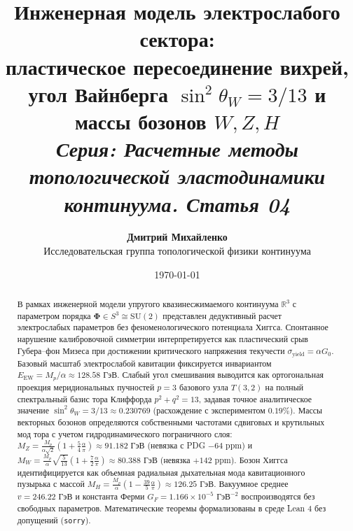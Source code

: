 \documentclass[11pt,a4paper]{article}
\theoremstyle{definition}
\theoremstyle{remark}
\begin{document}
\title{\textbf{\Large Инженерная модель электрослабого сектора:}\\
\large пластическое пересоединение вихрей, угол Вайнберга $\sin^2\theta_W = 3/13$ и массы бозонов $W, Z, H$\\[2mm]
\normalsize \textit{Серия: Расчетные методы топологической эластодинамики континуума. Статья 04}}

\author{\textbf{Дмитрий Михайленко}\\[1mm]
\small Исследовательская группа топологической физики континуума}

\date{\today}

\maketitle

\begin{abstract}
\noindent В рамках инженерной модели упругого квазинесжимаемого континуума $\mathbb{R}^3$ с параметром порядка $\boldsymbol{\Phi} \in S^3 \cong \mathrm{SU}(2)$ представлен дедуктивный расчет электрослабых параметров без феноменологического потенциала Хиггса. Спонтанное нарушение калибровочной симметрии интерпретируется как пластический срыв Губера--фон Мизеса при достижении критического напряжения текучести $\sigma_{\mathrm{yield}} = \alpha G_0$. Базовый масштаб электрослабой кавитации фиксируется инвариантом $E_{\mathrm{EW}} = M_p / \alpha \approx 128.58\text{ ГэВ}$. Слабый угол смешивания выводится как ортогональная проекция меридиональных пучностей $p=3$ базового узла $T(3,2)$ на полный спектральный базис тора Клиффорда $p^2 + q^2 = 13$, задавая точное аналитическое значение $\sin^2\theta_W = 3/13 \approx 0.230769$ (расхождение с экспериментом $0.19\%$). Массы векторных бозонов определяются собственными частотами сдвиговых и крутильных мод тора с учетом гидродинамического пограничного слоя: $M_Z = \frac{M_p}{\alpha\sqrt{2}}(1 + \frac{5}{4}\frac{\alpha}{\pi}) \approx 91.182\text{ ГэВ}$ (невязка с PDG $-64\text{ ppm}$) и $M_W = \frac{M_p}{\alpha}\sqrt{\frac{5}{13}}(1 + \frac{7}{2}\frac{\alpha}{\pi}) \approx 80.388\text{ ГэВ}$ (невязка $+142\text{ ppm}$). Бозон Хиггса идентифицируется как объемная радиальная дыхательная мода кавитационного пузырька с массой $M_H = \frac{M_p}{\alpha}(1 - \frac{39}{5}\frac{\alpha}{\pi}) \approx 126.25\text{ ГэВ}$. Вакуумное среднее $v = 246.22\text{ ГэВ}$ и константа Ферми $G_F = 1.166 \times 10^{-5}\text{ ГэВ}^{-2}$ воспроизводятся без свободных параметров. Математические теоремы формализованы в среде Lean 4 без допущений (\texttt{sorry}).
\end{abstract}
\end{document}
